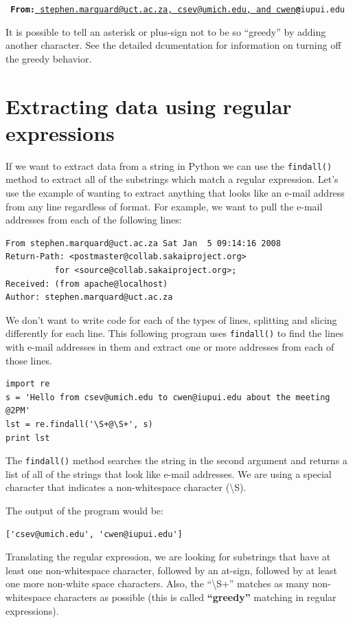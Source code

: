 \documentclass[10pt]{book}
\begin{document}
{\tt
{\bf From:}\underline{ stephen.marquard@uct.ac.za, csev@umich.edu, and cwen}{\bf @}iupui.edu
}

It is possible to tell an asterisk or plus-sign not to be so ``greedy'' by adding 
another character.   See the detailed dcumentation for information on turning off the 
greedy behavior.

\section{Extracting data using regular expressions}

If we want to extract data from a string in Python we can use the {\tt findall()} method to extract all of the substrings which match a regular expression.  Let's use the example of wanting to extract anything that looks like an e-mail address from any line regardless of format.  For example, we want to pull the e-mail addresses from each of the following lines:

\beforeverb
\begin{verbatim}
From stephen.marquard@uct.ac.za Sat Jan  5 09:14:16 2008
Return-Path: <postmaster@collab.sakaiproject.org>
          for <source@collab.sakaiproject.org>;
Received: (from apache@localhost)
Author: stephen.marquard@uct.ac.za
\end{verbatim}
\afterverb
%
We don't want to write code for each of the types of lines, splitting and slicing differently for each line.  This following program uses {\tt findall()} to find the lines with e-mail addresses in them and extract one or more addresses from each of those lines.

\beforeverb
\begin{verbatim}
import re
s = 'Hello from csev@umich.edu to cwen@iupui.edu about the meeting @2PM'
lst = re.findall('\S+@\S+', s)
print lst
\end{verbatim}
\afterverb
%
The {\tt findall()} method searches the string in the second argument and returns a list of all of the strings that look like e-mail addresses.   We are using a special character that indicates a non-whitespace character ({\textbackslash}S). 

The output of the program would be:

\beforeverb
\begin{verbatim}
['csev@umich.edu', 'cwen@iupui.edu']
\end{verbatim}
\afterverb
%
Translating the regular expression, we are looking for substrings that have at least one non-whitespace character, followed by an at-sign, followed by at least one more non-white space characters.  Also, the ``{\textbackslash}S+'' matches as many non-whitespace characters as possible (this is called {\bf ``greedy''} matching in regular expressions).  
\end{document}
